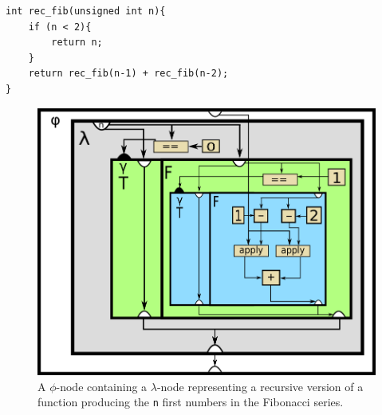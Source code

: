 \begin{lstlisting}[label={lst:rec_fib_phi}, style=global_customcpp,
caption={C/C++ code corresponding to the RVSDG subgraph in
Figure~\ref{fig:rec_fib_phi}, which represents a simple recursive fibonacci
function.}]
int rec_fib(unsigned int n){
	if (n < 2){
		return n;
	}
	return rec_fib(n-1) + rec_fib(n-2);
}
\end{lstlisting}
\vspace{-4\parskip} %

\begin{figure}[h!]
	\centering
	\includegraphics[width=\textwidth]{figures/recursive_fibonacci}
	\caption{A $\phi$-node containing a $\lambda$-node representing a recursive
version of a function producing the \lstinline!n! first numbers in the Fibonacci
series.}
	\label{fig:rec_fib_phi}
\end{figure}

